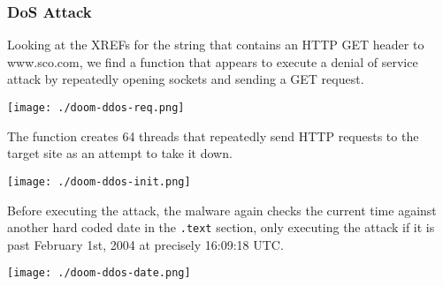 \documentclass[11pt]{article}
\begin{document}
\subsubsection{DoS Attack}
\label{sec:org45206f7}
Looking at the XREFs for the string that contains an HTTP GET header
to www.sco.com, we find a function that appears to execute a denial of
service attack by repeatedly opening sockets and sending a GET
request.

\begin{center}
\texttt{[image: ./doom-ddos-req.png]}
\end{center}

The function creates 64 threads that repeatedly send HTTP requests to
the target site as an attempt to take it down.

\begin{center}
\texttt{[image: ./doom-ddos-init.png]}
\end{center}

Before executing the attack, the malware again checks the current time
against another hard coded date in the \texttt{.text} section, only executing
the attack if it is past February 1st, 2004 at precisely 16:09:18 UTC.

\begin{center}
\texttt{[image: ./doom-ddos-date.png]}
\end{center}
\end{document}

